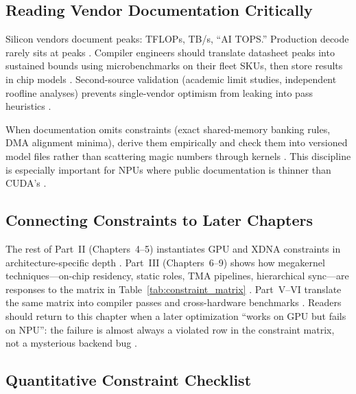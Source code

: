 \subsection{Reading Vendor Documentation Critically}
\label{sec:ch03_vendor_docs}

Silicon vendors document peaks: TFLOPs, TB/s, ``AI TOPS.'' Production decode rarely sits at peaks \citep{memoryfloor2026,patel2025llminference}.
Compiler engineers should translate datasheet peaks into sustained bounds using microbenchmarks on their fleet SKUs, then store results in chip models \citep{nvidia2022hopper,amd2024xdna}.
Second-source validation (academic limit studies, independent roofline analyses) prevents single-vendor optimism from leaking into pass heuristics \citep{patel2025llminference,memoryfloor2026,semianalysis2024tma}.

When documentation omits constraints (exact shared-memory banking rules, DMA alignment minima), derive them empirically and check them into versioned model files rather than scattering magic numbers through kernels \citep{amd2024aie,nvidia2022hopper}.
This discipline is especially important for NPUs where public documentation is thinner than CUDA's \citep{amd2024xdna}.

\subsection{Connecting Constraints to Later Chapters}
\label{sec:ch03_roadmap}

The rest of Part~II (Chapters~4--5) instantiates GPU and XDNA constraints in architecture-specific depth \citep{nvidia2022hopper,amd2024xdna,semianalysis2024tma}.
Part~III (Chapters~6--9) shows how megakernel techniques---on-chip residency, static roles, TMA pipelines, hierarchical sync---are responses to the matrix in Table~\ref{tab:constraint_matrix} \citep{patel2025llminference}.
Part~V--VI translate the same matrix into compiler passes and cross-hardware benchmarks \citep{dlbook,patel2025llminference}.
Readers should return to this chapter when a later optimization ``works on GPU but fails on NPU'': the failure is almost always a violated row in the constraint matrix, not a mysterious backend bug \citep{amd2024xdna,memoryfloor2026}.

\subsection{Quantitative Constraint Checklist}
\label{sec:ch03_checklist}

